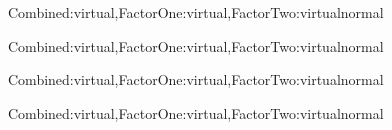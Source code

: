   {\begin{TNDiagram}[compact]\end{TNDiagram}}
  {Combined:virtual,FactorOne:virtual,FactorTwo:virtual}{normal}
  {\begin{TNDiagram}
   \end{TNDiagram}}
  {Combined:virtual,FactorOne:virtual,FactorTwo:virtual}{normal}
  {\begin{TNDiagram}
   \end{TNDiagram}}
  {Combined:virtual,FactorOne:virtual,FactorTwo:virtual}{normal}
  {\begin{TNDiagram}
   \end{TNDiagram}}
  {Combined:virtual,FactorOne:virtual,FactorTwo:virtual}{normal}
  {\begin{TNDiagram}
   \end{TNDiagram}}

\endinput
